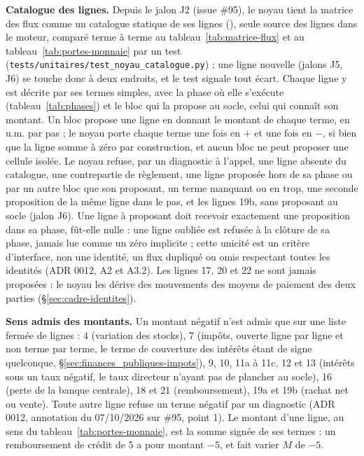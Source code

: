 \documentclass[11pt,a4paper]{article}
\newcommand{\code}[1]{\texttt{\detokenize{#1}}}
\begin{document}
\textbf{Catalogue des lignes.} Depuis le jalon J2 (issue \#95), le noyau tient la matrice des flux comme un catalogue statique de ses lignes (\code{nations.noyau.catalogue.LIGNES}), seule source des lignes dans le moteur, comparé terme à terme au tableau~\ref{tab:matrice-flux} et au tableau~\ref{tab:portes-monnaie} par un test (\nolinkurl{tests/unitaires/test_noyau_catalogue.py}) ; une ligne nouvelle (jalons J5, J6) se touche donc à deux endroits, et le test signale tout écart. Chaque ligne y est décrite par ses termes simples, avec la phase où elle s'exécute (tableau~\ref{tab:phases}) et le bloc qui la propose au socle, celui qui connaît son montant. Un bloc propose une ligne en donnant le montant de chaque terme, en u.m. par pas ; le noyau porte chaque terme une fois en $+$ et une fois en $-$, si bien que la ligne somme à zéro par construction, et aucun bloc ne peut proposer une cellule isolée. Le noyau refuse, par un diagnostic à l'appel, une ligne absente du catalogue, une contrepartie de règlement, une ligne proposée hors de sa phase ou par un autre bloc que son proposant, un terme manquant ou en trop, une seconde proposition de la même ligne dans le pas, et les lignes 19b, sans proposant au socle (jalon J6). Une ligne à proposant doit recevoir exactement une proposition dans sa phase, fût-elle nulle : une ligne oubliée est refusée à la clôture de sa phase, jamais lue comme un zéro implicite ; cette unicité est un critère d'interface, non une identité, un flux dupliqué ou omis respectant toutes les identités (ADR 0012, A2 et A3.2). Les lignes 17, 20 et 22 ne sont jamais proposées : le noyau les dérive des mouvements des moyens de paiement des deux parties (\S\ref{sec:cadre-identites}).

\textbf{Sens admis des montants.} Un montant négatif n'est admis que sur une liste fermée de lignes : 4 (variation des stocks), 7 (impôts, ouverte ligne par ligne et non terme par terme, le terme de couverture des intérêts étant de signe quelconque, \S\ref{sec:finances_publiques-impots}), 9, 10, 11a à 11c, 12 et 13 (intérêts sous un taux négatif, le taux directeur n'ayant pas de plancher au socle), 16 (perte de la banque centrale), 18 et 21 (remboursement), 19a et 19b (rachat net ou vente). Toute autre ligne refuse un terme négatif par un diagnostic (ADR 0012, annotation du 07/10/2026 sur \#95, point 1). Le montant d'une ligne, au sens du tableau~\ref{tab:portes-monnaie}, est la somme signée de ses termes : un remboursement de crédit de 5 a pour montant $-5$, et fait varier $M$ de $-5$.
\end{document}
